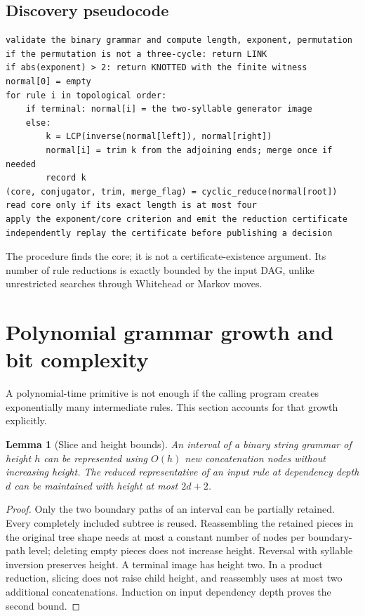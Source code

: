 \documentclass[11pt,letterpaper]{article}
\newtheorem{lemma}[theorem]{Lemma}
\theoremstyle{definition}\newtheorem{definition}[theorem]{Definition}
\theoremstyle{remark}\newtheorem{remark}[theorem]{Remark}
\begin{document}
\subsection{Discovery pseudocode}
\noindent\begin{minipage}{\linewidth}
\begin{lstlisting}
validate the binary grammar and compute length, exponent, permutation
if the permutation is not a three-cycle: return LINK
if abs(exponent) > 2: return KNOTTED with the finite witness
normal[0] = empty
for rule i in topological order:
    if terminal: normal[i] = the two-syllable generator image
    else:
        k = LCP(inverse(normal[left]), normal[right])
        normal[i] = trim k from the adjoining ends; merge once if needed
        record k
(core, conjugator, trim, merge_flag) = cyclic_reduce(normal[root])
read core only if its exact length is at most four
apply the exponent/core criterion and emit the reduction certificate
independently replay the certificate before publishing a decision
\end{lstlisting}
\end{minipage}
The procedure finds the core; it is not a certificate-existence argument. Its number of rule reductions is exactly bounded by the input DAG, unlike unrestricted searches through Whitehead or Markov moves.

\section{Polynomial grammar growth and bit complexity}
A polynomial-time primitive is not enough if the calling program creates exponentially many intermediate rules. This section accounts for that growth explicitly.

\begin{lemma}[Slice and height bounds]\label{lem:height}
An interval of a binary string grammar of height $h$ can be represented using $O(h)$ new concatenation nodes without increasing height. The reduced representative of an input rule at dependency depth $d$ can be maintained with height at most $2d+2$.
\end{lemma}
\begin{proof}
Only the two boundary paths of an interval can be partially retained. Every completely included subtree is reused. Reassembling the retained pieces in the original tree shape needs at most a constant number of nodes per boundary-path level; deleting empty pieces does not increase height. Reversal with syllable inversion preserves height. A terminal image has height two. In a product reduction, slicing does not raise child height, and reassembly uses at most two additional concatenations. Induction on input dependency depth proves the second bound.
\end{proof}
\end{document}

